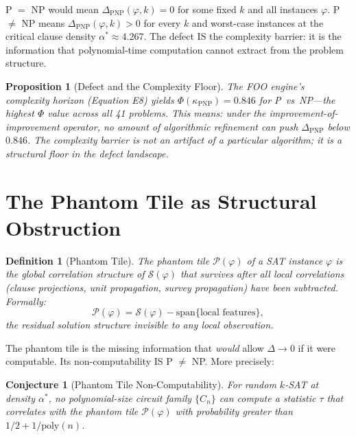 \documentclass[12pt, openany]{book}
\newtheorem{proposition}[theorem]{Proposition}
\newtheorem{conjecture}[theorem]{Conjecture}
\newtheorem{definition}[theorem]{Definition}
\theoremstyle{remark}
\begin{document}
\noindent
P $=$ NP would mean $\Delta_{\mathrm{PNP}}(\varphi, k) = 0$ for some fixed $k$
and all instances $\varphi$.  P $\neq$ NP means $\Delta_{\mathrm{PNP}}(\varphi, k) > 0$
for every $k$ and worst-case instances at the critical clause density
$\alpha^* \approx 4.267$.  The defect IS the complexity barrier: it is the
information that polynomial-time computation cannot extract from the problem
structure.

\begin{proposition}[Defect and the Complexity Floor]
\label{prop:phi-pnp}
The FOO engine's complexity horizon (Equation E8) yields
$\Phi(\kappa_{\mathrm{PNP}}) = 0.846$ for P~vs~NP---the highest
$\Phi$ value across all 41 problems.  This means: under the
improvement-of-improvement operator, no amount of algorithmic
refinement can push $\Delta_{\mathrm{PNP}}$ below $0.846$.
The complexity barrier is not an artifact of a particular algorithm;
it is a \emph{structural floor} in the defect landscape.
\end{proposition}


\section{The Phantom Tile as Structural Obstruction}
\label{sec:phantom-tile}

\begin{definition}[Phantom Tile]
\label{def:phantom-tile}
The \emph{phantom tile} $\mathcal{P}(\varphi)$ of a SAT instance $\varphi$ is
the global correlation structure of $\mathcal{S}(\varphi)$ that survives after
all local correlations (clause projections, unit propagation, survey propagation)
have been subtracted.  Formally:
\[
  \mathcal{P}(\varphi) = \mathcal{S}(\varphi) - \mathrm{span}\{\text{local features}\},
\]
the residual solution structure invisible to any local observation.
\end{definition}

\noindent
The phantom tile is the missing information that \emph{would} allow $\Delta \to 0$
if it were computable.  Its non-computability IS P $\neq$ NP.  More precisely:

\begin{conjecture}[Phantom Tile Non-Computability]
\label{conj:phantom-nc}
For random $k$-SAT at density $\alpha^*$, no polynomial-size circuit family
$\{C_n\}$ can compute a statistic $\tau$ that correlates with the phantom tile
$\mathcal{P}(\varphi)$ with probability greater than $1/2 + 1/\mathrm{poly}(n)$.
\end{conjecture}
\end{document}
